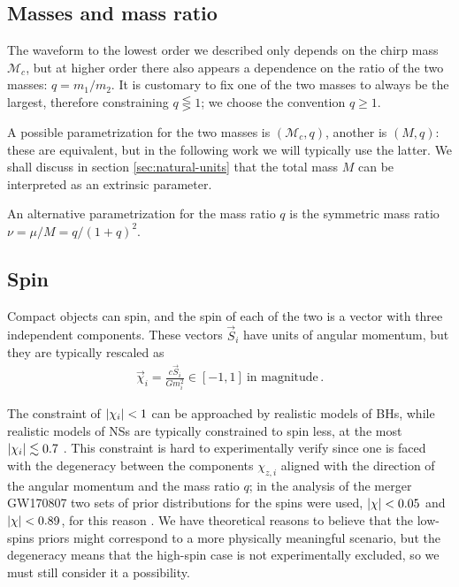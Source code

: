 \documentclass[main.tex]{subfiles}
\begin{document}
\subsection{Masses and mass ratio}

The waveform to the lowest order we described only depends on the chirp mass \(\mathcal{M}_c\), but at higher order there also appears a dependence on the ratio of the two masses: \(q = m_1 / m_2 \).
It is customary to fix one of the two masses to always be the largest, therefore constraining \(q \lesseqgtr 1\); we choose the convention \(q \geq 1\).

A possible parametrization for the two masses is \((\mathcal{M}_c, q)\), another is \((M, q)\): these are equivalent, but in the following work we will typically use the latter. 
We shall discuss in section \ref{sec:natural-units} that the total mass \(M\) can be interpreted as an extrinsic parameter.

An alternative parametrization for the mass ratio \(q\) is the symmetric mass ratio \(\nu = \mu / M = q / (1 + q)^2\).



\subsection{Spin}

Compact objects can spin, and the spin of each of the two is a vector with three independent components. 
These vectors \(\vec{S}_i\) have units of angular momentum, but they are typically rescaled as 
%
\begin{align}
\vec{\chi}_i = \frac{c\vec{S}_i}{G m_i^2} \in [-1, 1] 
\ \text{in magnitude}
\,.
\end{align}

The constraint of \(\abs{\chi_i} < 1\) can be approached by realistic models of \acsp{BH}, while realistic models of \acsp{NS} are typically constrained to spin less, at the most \(\abs{\chi _i} \lesssim 0.7\) \cite{loSpinParameterUniformly2011}.
This constraint is hard to experimentally verify since one is faced with the degeneracy between the components \(\chi_{z,i}\) aligned with the direction of the angular momentum and the mass ratio \(q\); in the analysis of the merger GW170807 two sets of prior distributions for the spins were used, \(\abs{\chi } < 0.05\) and \(\abs{\chi } < 0.89\), for this reason \cite{abbottGW170817ObservationGravitational2017}. We have theoretical reasons to believe that the low-spins priors might correspond to a more physically meaningful scenario, but the degeneracy means that the high-spin case is not experimentally excluded, so we must still consider it a possibility.
\end{document}

